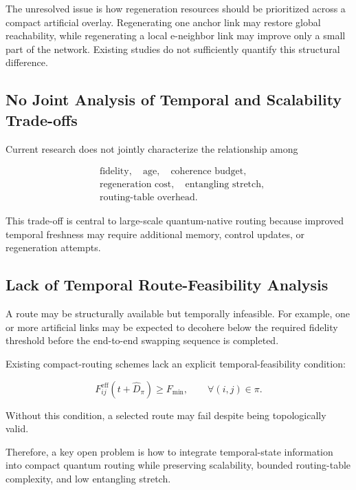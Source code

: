 The unresolved issue is how regeneration resources should be prioritized across a compact artificial overlay. Regenerating one anchor link may restore global reachability, while regenerating a local e-neighbor link may improve only a small part of the network. Existing studies do not sufficiently quantify this structural difference.

\subsection{No Joint Analysis of Temporal and Scalability Trade-offs}

Current research does not jointly characterize the relationship among

\begin{equation}
\begin{aligned}
&\text{fidelity},\quad \text{age},\quad \text{coherence budget},\\
&\text{regeneration cost},\quad \text{entangling stretch},\\
&\text{routing-table overhead}.
\end{aligned}
\end{equation}

This trade-off is central to large-scale quantum-native routing because improved temporal freshness may require additional memory, control updates, or regeneration attempts.

\subsection{Lack of Temporal Route-Feasibility Analysis}

A route may be structurally available but temporally infeasible. For example, one or more artificial links may be expected to decohere below the required fidelity threshold before the end-to-end swapping sequence is completed.

Existing compact-routing schemes lack an explicit temporal-feasibility condition:

\begin{equation}
    F_{ij}^{\mathrm{eff}}
    \left(
    t+\widehat{D}_{\pi}
    \right)
    \geq
    F_{\min},
    \qquad
    \forall (i,j)\in\pi.
\end{equation}

Without this condition, a selected route may fail despite being topologically valid.

Therefore, a key open problem is how to integrate temporal-state information into compact quantum routing while preserving scalability, bounded routing-table complexity, and low entangling stretch.

